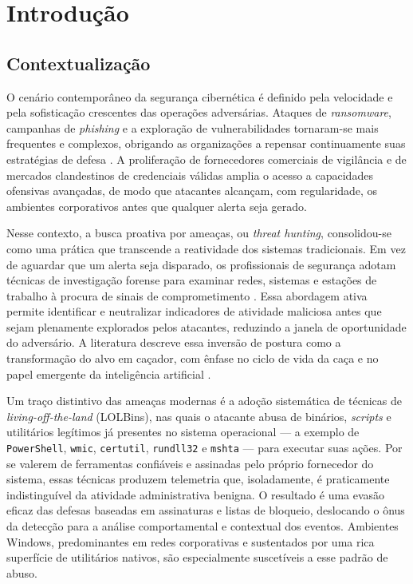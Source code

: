 \chapter{Introdução}
\label{cap:introducao}

\section{Contextualização}
\label{sec:contexto}

O cenário contemporâneo da segurança cibernética é definido pela velocidade e
pela sofisticação crescentes das operações adversárias. Ataques de
\emph{ransomware}, campanhas de \emph{phishing} e a exploração de
vulnerabilidades tornaram-se mais frequentes e complexos, obrigando as
organizações a repensar continuamente suas estratégias de defesa
\cite{academia20}. A proliferação de fornecedores comerciais de vigilância e de
mercados clandestinos de credenciais válidas amplia o acesso a capacidades
ofensivas avançadas, de modo que atacantes alcançam, com regularidade, os
ambientes corporativos antes que qualquer alerta seja gerado.

Nesse contexto, a busca proativa por ameaças, ou \emph{threat hunting},
consolidou-se como uma prática que transcende a reatividade dos sistemas
tradicionais. Em vez de aguardar que um alerta seja disparado, os profissionais
de segurança adotam técnicas de investigação forense para examinar redes,
sistemas e estações de trabalho à procura de sinais de comprometimento
\cite{academia22}. Essa abordagem ativa permite identificar e neutralizar
indicadores de atividade maliciosa antes que sejam plenamente explorados pelos
atacantes, reduzindo a janela de oportunidade do adversário. A literatura
descreve essa inversão de postura como a transformação do alvo em caçador, com
ênfase no ciclo de vida da caça e no papel emergente da inteligência artificial
\cite{hillier2022turninghuntedhunterthreat}.

Um traço distintivo das ameaças modernas é a adoção sistemática de técnicas de
\emph{living-off-the-land} (LOLBins), nas quais o atacante abusa de binários,
\emph{scripts} e utilitários legítimos já presentes no sistema operacional — a
exemplo de \texttt{PowerShell}, \texttt{wmic}, \texttt{certutil},
\texttt{rundll32} e \texttt{mshta} — para executar suas ações. Por se valerem de
ferramentas confiáveis e assinadas pelo próprio fornecedor do sistema, essas
técnicas produzem telemetria que, isoladamente, é praticamente
indistinguível da atividade administrativa benigna. O resultado é uma evasão
eficaz das defesas baseadas em assinaturas e listas de bloqueio, deslocando o
ônus da detecção para a análise comportamental e contextual dos eventos.
Ambientes Windows, predominantes em redes corporativas e sustentados por uma
rica superfície de utilitários nativos, são especialmente suscetíveis a esse
padrão de abuso.


